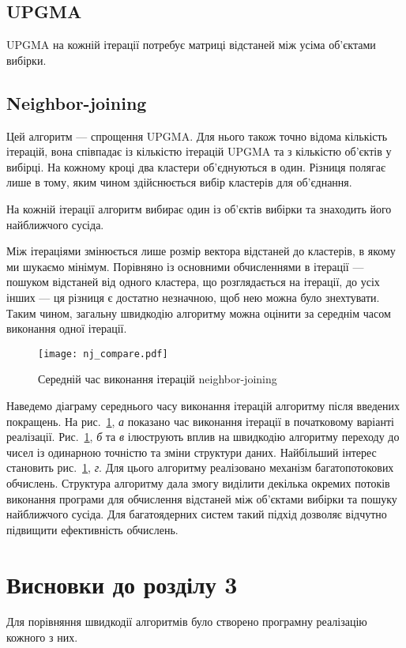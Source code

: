             \subsection{UPGMA}
                UPGMA на кожній ітерації потребує матриці відстаней між усіма об’єктами вибірки. 
                
            \subsection{Neighbor-joining}
                Цей алгоритм --- спрощення UPGMA. Для нього також точно відома кількість ітерацій, вона співпадає із кількістю ітерацій UPGMA та з кількістю об’єктів у вибірці. На кожному кроці два кластери об’єднуються в один. Різниця полягає лише в тому, яким чином здійснюється вибір кластерів для об’єднання.
                
                На кожній ітерації алгоритм вибирає один із об’єктів вибірки та знаходить його найближчого сусіда. 
                
                Між ітераціями змінюється лише розмір вектора відстаней до кластерів, в якому ми шукаємо мінімум. Порівняно із основними обчисленнями в ітерації --- пошуком відстаней від одного кластера, що розглядається на ітерації, до усіх інших --- ця різниця є достатно незначною, щоб нею можна було знехтувати. Таким чином, загальну швидкодію алгоритму можна оцінити за середнім часом виконання одної ітерації.
                
                \begin{figure}
                    \centering
                    \texttt{[image: nj\_compare.pdf]}
                    \caption{Середній час виконання ітерацій neighbor-joining}\label{fig:nj_compare}
                \end{figure}
                
                Наведемо діаграму середнього часу виконання ітерацій алгоритму після введених покращень. На рис.~\ref{fig:nj_compare}, \emph{а} показано час виконання ітерації в початковому варіанті реалізації. Рис.~\ref{fig:nj_compare}, \emph{б} та \emph{в} ілюструють вплив на швидкодію алгоритму переходу до чисел із одинарною точністю та зміни структури даних. Найбільший інтерес становить рис.~\ref{fig:nj_compare}, \emph{г}. Для цього алгоритму реалізовано механізм багатопотокових обчислень. Структура алгоритму дала змогу виділити декілька окремих потоків виконання програми для обчислення відстаней між об’єктами вибірки та пошуку найближчого сусіда. Для багатоядерних систем такий підхід дозволяє відчутно підвищити ефективність обчислень.
                
        \section{Висновки до розділу 3}
            Для порівняння швидкодії алгоритмів було створено програмну реалізацію кожного з них. 
                

